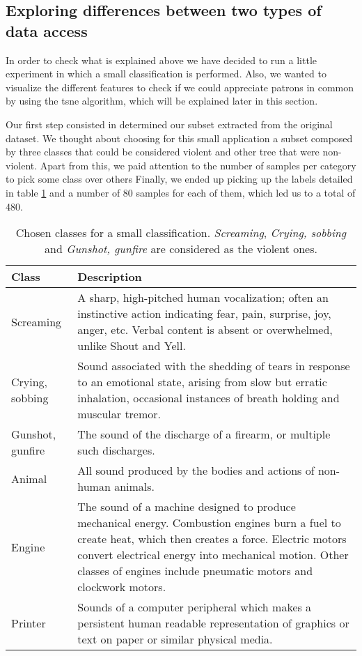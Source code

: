 	
\subsection{Exploring differences between two types of data access}
\label{subsection:exploring-differences-between-two-types-of-data-access}

	In order to check what is explained above we have decided to run a little experiment in which a small classification is performed. Also, we wanted to visualize the different features to check if we could appreciate patrons in common by using the \acrfull{tsne} algorithm, which will be explained later in this section.
	
	Our first step consisted in determined our subset extracted from the original dataset. We thought about choosing for this small application a subset composed by three classes that could be considered violent and other tree that were non-violent. Apart from this, we paid attention to the number of samples per category to pick some class over others Finally, we ended up picking up the labels detailed in table \ref{table:4} and a number of 80 samples for each of them, which led us to a total of 480.
	
	\begin{table}[h]
	\begin{center}
		\begin{tabular}{||m{7em} | m{23em} ||}
			\hline
			\textbf{Class} & \textbf{Description} \\
			\hline\hline
			Screaming & A sharp, high-pitched human vocalization; often an instinctive action indicating fear, pain, surprise, joy, anger, etc. Verbal content is absent or overwhelmed, unlike Shout and Yell. \\
			\hline
			Crying, sobbing & Sound associated with the shedding of tears in response to an emotional state, arising from slow but erratic inhalation, occasional instances of breath holding and muscular tremor. \\
			\hline
			Gunshot, gunfire & The sound of the discharge of a firearm, or multiple such discharges. \\
			\hline
			Animal & All sound produced by the bodies and actions of non-human animals. \\
			\hline
			Engine & The sound of a machine designed to produce mechanical energy. Combustion engines burn a fuel to create heat, which then creates a force. Electric motors convert electrical energy into mechanical motion. Other classes of engines include pneumatic motors and clockwork motors. \\
			\hline
			Printer & Sounds of a computer peripheral which makes a persistent human readable representation of graphics or text on paper or similar physical media. \\
			\hline
		\end{tabular}
	\end{center}
	\caption{Chosen classes for a small classification. \textit{Screaming}, \textit{Crying, sobbing} and \textit{Gunshot, gunfire} are considered as the violent ones.}
	\label{table:4}
	\end{table}
	
